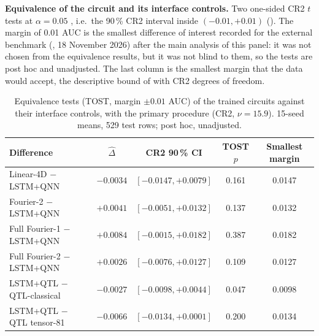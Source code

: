 \documentclass[11pt,a4paper]{article}
\begin{document}
\textbf{Equivalence of the circuit and its interface controls.} Two one-sided CR2 $t$ tests at $\alpha=0.05$ \citep{schuirmann1987,lakens2017}, i.e.\ the 90\,\% CR2 interval inside $(-0.01,+0.01)$ (). The margin of 0.01 AUC is the smallest difference of interest recorded for the external benchmark (, 18 November 2026) after the main analysis of this panel: it was not chosen from the equivalence results, but it was not blind to them, so the tests are post hoc and unadjusted. The last column is the smallest margin that the data would accept, the descriptive bound of  with CR2 degrees of freedom.

\begin{table}[htbp]
\centering
\caption{Equivalence tests (TOST, margin $\pm0.01$ AUC) of the trained circuits against their interface controls, with the primary procedure (CR2, $\nu=15.9$). 15-seed means, 529 test rows; post hoc, unadjusted.}
\label{tab:tost}
{\small
\begin{tabular}{lcccc}
\toprule
\textbf{Difference} & $\hat\Delta$ & \textbf{CR2 90\,\% CI} & \textbf{TOST $p$} & \textbf{Smallest margin} \\
\midrule
Linear-4D $-$ LSTM+QNN & $-0.0034$ & $[-0.0147,+0.0079]$ & 0.161 & 0.0147 \\
Fourier-2 $-$ LSTM+QNN & $+0.0041$ & $[-0.0051,+0.0132]$ & 0.137 & 0.0132 \\
Full Fourier-1 $-$ LSTM+QNN & $+0.0084$ & $[-0.0015,+0.0182]$ & 0.387 & 0.0182 \\
Full Fourier-2 $-$ LSTM+QNN & $+0.0026$ & $[-0.0076,+0.0127]$ & 0.109 & 0.0127 \\
LSTM+QTL $-$ QTL-classical & $-0.0027$ & $[-0.0098,+0.0044]$ & 0.047 & 0.0098 \\
LSTM+QTL $-$ QTL tensor-81 & $-0.0066$ & $[-0.0134,+0.0001]$ & 0.200 & 0.0134 \\
\bottomrule
\end{tabular}}
\end{table}
\end{document}
